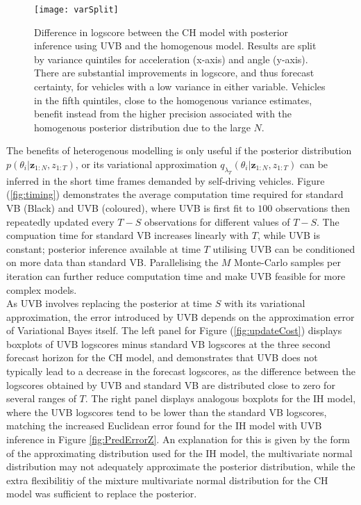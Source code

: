 \documentclass[12pt,a4paper]{article}\usepackage[]{graphicx}\usepackage[]{color}
\begin{document}
\begin{figure}[ht]
\centering
\texttt{[image: varSplit]}
\caption{Difference in logscore between the CH model with posterior inference using UVB and the homogenous model. Results are split by variance quintiles for acceleration (x-axis) and angle (y-axis). There are substantial improvements in logscore, and thus forecast certainty, for vehicles with a low variance in either variable. Vehicles in the fifth quintiles, close to the homogenous variance estimates, benefit instead from the higher precision associated with the homogenous posterior distribution due to the large $N$.}
\label{fig:varSplit}
\end{figure}

The benefits of heterogenous modelling is only useful if the posterior distribution $p(\theta_{i} | \textbf{z}_{1:N}, z_{1:T})$, or its variational approximation $q_{\lambda_T}(\theta_{i} | \textbf{z}_{1:N}, z_{1:T})$ can be inferred in the short time frames demanded by self-driving vehicles. Figure (\ref{fig:timing}) demonstrates the average computation time required for standard VB (Black) and UVB (coloured), where UVB is first fit to $100$ observations then repeatedly updated every $T-S$ observations for different values of $T-S$. The compuation time for standard VB increases linearly with $T$, while UVB is constant; posterior inference available at time $T$ utilising UVB can be conditioned on more data than standard VB. Parallelising the $M$ Monte-Carlo samples per iteration can further reduce computation time and make UVB feasible for more complex models. 
\\

As UVB involves replacing the posterior at time $S$ with its variational approximation, the error introduced by UVB depends on the approximation error of Variational Bayes itself. The left panel for Figure (\ref{fig:updateCost}) displays boxplots of UVB logscores minus standard VB logscores at the three second forecast horizon for the CH model, and demonstrates that UVB does not typically lead to a decrease in the forecast logscores, as the difference between the logscores obtained by UVB and standard VB are distributed close to zero for several ranges of $T$. The right panel displays analogous boxplots for the IH model, where the UVB logscores tend to be lower than the standard VB logscores, matching the increased Euclidean error found for the IH model with UVB inference in Figure \ref{fig:PredErrorZ}. An explanation for this is given by the form of the approximating distribution used for the IH model, the multivariate normal distribution may not adequately approximate the posterior distribution, while the extra flexibilitiy of the mixture multivariate normal distribution for the CH model was sufficient to replace the posterior.
\end{document}

